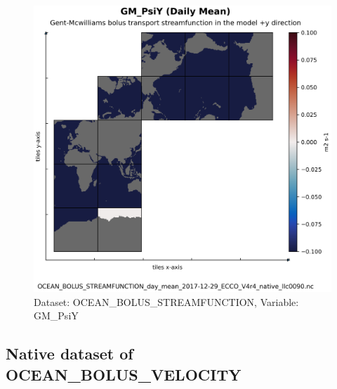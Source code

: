 \begin{figure}[H]
\centering
\includegraphics[scale=0.55]{../images/plots/native_plots/Gent-McWilliams_Bolus_Transport_Streamfunction/GM_PsiY.png}
\caption{Dataset: OCEAN\_BOLUS\_STREAMFUNCTION, Variable: GM\_PsiY}
\label{tab:table-OCEAN_BOLUS_STREAMFUNCTION_GM_PsiY-Plot}
\end{figure}
\subsection{Native dataset of OCEAN\_BOLUS\_VELOCITY}
\newp
